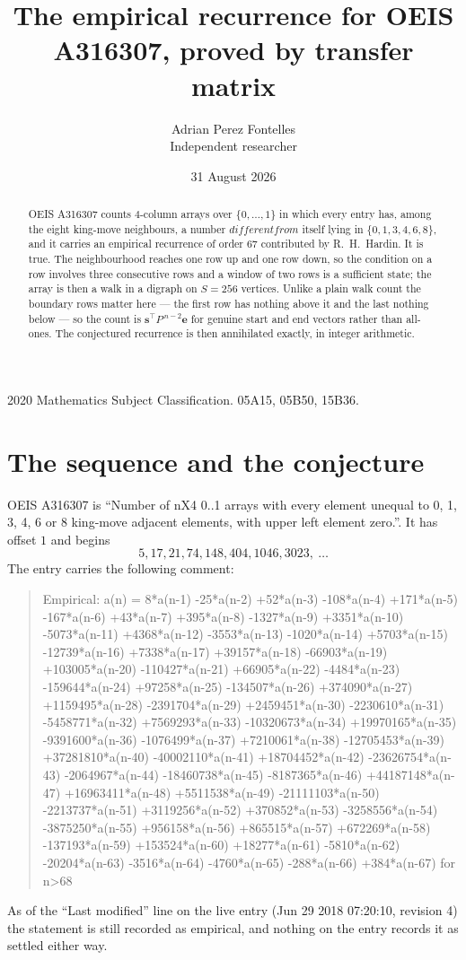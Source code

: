 \documentclass[11pt,a4paper]{article}
\title{The empirical recurrence for OEIS A316307, proved by transfer matrix}
\author{Adrian Perez Fontelles\\ \small Independent researcher}
\date{31 August 2026}
\theoremstyle{plain}
\theoremstyle{definition}
\begin{document}
\maketitle

\begin{abstract}
OEIS A316307 counts $4$-column arrays over $\{0,\dots,1\}$ in which every entry has,
among the eight king-move neighbours, a number $different from$ itself lying in $\{0,1,3,4,6,8\}$, and it carries an empirical
recurrence of order $67$ contributed by R.~H.~Hardin. It is true. The neighbourhood
reaches one row up and one row down, so the condition on a row involves three consecutive
rows and a window of two rows is a sufficient state; the array is then a walk in a digraph
on $S=256$ vertices. Unlike a plain walk count the boundary rows matter here --- the first
row has nothing above it and the last nothing below --- so the count is
$\mathbf{s}^{\!\top}P^{\,n-2}\mathbf{e}$ for genuine start and end vectors rather than
all-ones. The conjectured recurrence is then annihilated exactly, in integer arithmetic.
\end{abstract}

\noindent\small 2020 Mathematics Subject Classification. 05A15, 05B50, 15B36.\normalsize

\section{The sequence and the conjecture}

OEIS A316307 is ``Number of nX4 0..1 arrays with every element unequal to 0, 1, 3, 4, 6 or 8 king-move adjacent elements, with upper left element zero.''. It has offset
$1$ and begins
\[
5, 17, 21, 74, 148, 404, 1046, 3023,\ \dots
\]
The entry carries the following comment:
\begin{quote}\small
Empirical: a(n) = 8*a(n-1) -25*a(n-2) +52*a(n-3) -108*a(n-4) +171*a(n-5) -167*a(n-6) +43*a(n-7) +395*a(n-8) -1327*a(n-9) +3351*a(n-10) -5073*a(n-11) +4368*a(n-12) -3553*a(n-13) -1020*a(n-14) +5703*a(n-15) -12739*a(n-16) +7338*a(n-17) +39157*a(n-18) -66903*a(n-19) +103005*a(n-20) -110427*a(n-21) +66905*a(n-22) -4484*a(n-23) -159644*a(n-24) +97258*a(n-25) -134507*a(n-26) +374090*a(n-27) +1159495*a(n-28) -2391704*a(n-29) +2459451*a(n-30) -2230610*a(n-31) -5458771*a(n-32) +7569293*a(n-33) -10320673*a(n-34) +19970165*a(n-35) -9391600*a(n-36) -1076499*a(n-37) +7210061*a(n-38) -12705453*a(n-39) +37281810*a(n-40) -40002110*a(n-41) +18704452*a(n-42) -23626754*a(n-43) -2064967*a(n-44) -18460738*a(n-45) -8187365*a(n-46) +44187148*a(n-47) +16963411*a(n-48) +5511538*a(n-49) -21111103*a(n-50) -2213737*a(n-51) +3119256*a(n-52) +370852*a(n-53) -3258556*a(n-54) -3875250*a(n-55) +956158*a(n-56) +865515*a(n-57) +672269*a(n-58) -137193*a(n-59) +153524*a(n-60) +18277*a(n-61) -5810*a(n-62) -20204*a(n-63) -3516*a(n-64) -4760*a(n-65) -288*a(n-66) +384*a(n-67) for n>68
\end{quote}
As of the ``Last modified'' line on the live entry (Jun 29 2018 07:20:10, revision
4) the statement is still recorded as empirical, and nothing on the entry
records it as settled either way.
\end{document}

